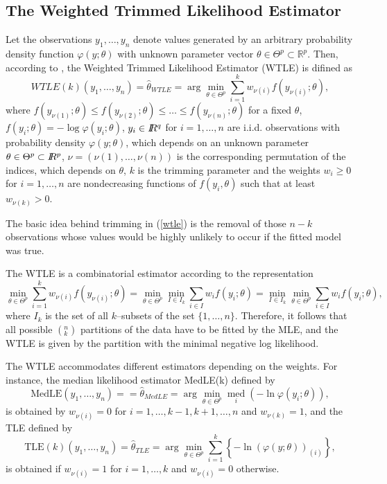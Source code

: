 \documentclass[article,shortnames,nojss]{jss}
\begin{document}
\subsection{The Weighted Trimmed Likelihood Estimator}
 Let the observations $y_1,\ldots,y_n$ denote values generated by an arbitrary probability density function $\varphi(y;\theta)$ with unknown parameter vector $\theta \in \Theta^p \subset \mathbb{R}^p$. Then, according to \cite{VN1998}, the Weighted Trimmed Likelihood Estimator (WTLE) is difined as
    \begin{equation}
    WTLE(k) (y_1,\ldots,y_n) = \hat{\theta}_{WTLE} = \arg \min_{\theta \in \Theta^p} \sum_{i=1}^k w_{\nu(i)} f(y_{\nu(i)}; \theta),\label{wtle}
    \end{equation}
where $f(y_{\nu(1)};\theta) \leq f(y_{\nu(2)};\theta) \leq \ldots \leq
f(y_{\nu(n)};\theta)$ for a fixed $\theta$,
$f(y_{i};\theta)=-\log\varphi(y_{i};\theta)$,
$y_i \in   I\hskip -3.5pt R^q$ for  $i=1,\ldots, n$ are i.i.d. observations with
probability density $\varphi(y;\theta)$, which depends on an unknown parameter
$\theta\in \Theta^{p} \subset I\hskip -3.5pt R^p$,
$\nu=(\nu(1),\ldots, \nu(n))$ is the corresponding permutation of the indices,
which depends on $\theta$, $k$ is the trimming parameter and the weights  $w_i
\ge 0$ for $i=1,\ldots,n$ are nondecreasing functions of $f(y_i,\theta)$ such
that at least $w_{\nu(k)} >0$.

The basic idea behind trimming in (\ref{wtle}) is the removal of those
$n-k$ observations whose values would be highly unlikely to occur if the fitted
model was true.

The WTLE is a combinatorial estimator according to the representation
$$
\mathop {\min }\limits_{\theta\in \Theta^{p}} \sum \limits_{i = 1}^k
w_{\nu(i)} f(y_{\nu(i)};\theta) =
\mathop {\min }\limits_{\theta\in \Theta^{p}} \mathop {\min }\limits_{I \in I_k
} \sum\limits_{i \in I} w_i f (y_i;\theta) = \mathop {\min }\limits_{I \in I_k
} \mathop {\min }\limits_{\theta\in \Theta^{p}} \sum\limits_{i \in I} w_i f
(y_i;\theta),
$$
where $I_k$ is the set of all $k$--subsets of the set $\{1,\ldots,n\}$.
Therefore, it
follows that all possible $(^{n}_{k})$ partitions of the data have to be fitted
by the MLE, and the WTLE is given by the partition with the minimal negative log likelihood.


   The WTLE accommodates different estimators depending on the weights. For instance, the median likelihood estimator MedLE(k) defined by \cite{VN1993}
   \begin{equation}
   \text{MedLE}(y_1,\ldots,y_n) = = \hat{\theta}_{MedLE} = \arg \min_{\theta \in \Theta^p} \underset{i}{\operatorname{med}} (- \ln \varphi(y_i; \theta)),\label{medle}
   \end{equation}
   is obtained by $w_{\nu(i)}=0$ for $i=1,\ldots,k-1,k+1,\ldots,n$ and $w_{\nu(k)} = 1$, and the TLE  defined by \cite{NN1990}
   \begin{equation}
   \text{TLE}(k) (y_1,\ldots,y_n) = \hat{\theta}_{TLE}= \arg \min_{\theta \in \Theta^p} \sum_{i=1}^k \left\lbrace - \ln(\varphi(y;\theta))_{(i)} \right\rbrace,\label{tle}
   \end{equation}
   is obtained if $w_{\nu(i)}=1$ for $i=1,\ldots,k$ and $w_{\nu(i)}=0$ otherwise.
\end{document}
